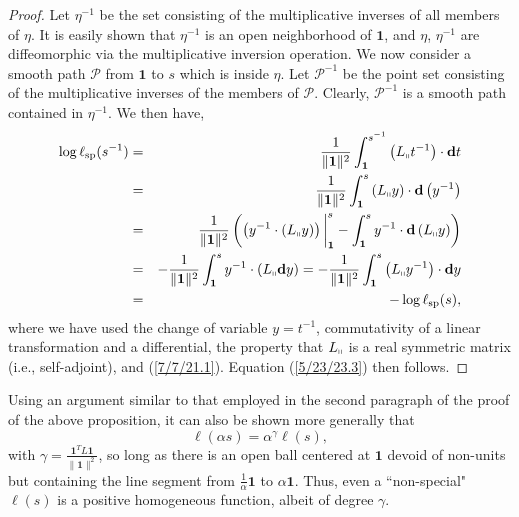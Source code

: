 \documentclass{amsart}
\theoremstyle{definition}
\numberwithin{theorem}{section}
\numberwithin{equation}{section}
\begin{document}
\begin{proof}
Let $\eta^{-1}$ be the set consisting of the multiplicative inverses of all members of $\eta$.  It is easily shown that $\eta^{-1}$ is an open neighborhood of $\mathbf{1}$, and $\eta$, $\eta^{-1}$ are diffeomorphic via the multiplicative inversion operation.  
We now consider a smooth path $\mathcal{P}$ from $\mathbf{1}$ to $s$ which is inside $\eta$.  Let $\mathcal{P}^{-1}$ be the point set consisting of the multiplicative inverses of the members of $\mathcal{P}$.  Clearly, $\mathcal{P}^{-1}$ is a smooth path contained in $\eta^{-1}$. 
 We then have, 
\begin{eqnarray}  \log \ell_{\rm sp}(s^{-1})   &=&   \frac{1}{\|{\bf 1}\|^2} \int_{\bf 1}^{s^{-1}} \left(L_{\shortparallel}t^{-1}\right) \cdot \mathbf{d}t \nonumber \\ &=&  \frac{1}{\|{\bf 1}\|^2} \int_{\bf 1}^s \left(L_{\shortparallel}y\right)\cdot \mathbf{d}\left(y^{-1}\right) \nonumber \\ &=&  \frac{1}{\|{\bf 1}\|^2}\left(\left(y^{-1}\cdot \left(L_{\shortparallel}y\right)\right)\bigg|_{\bf 1}^s - \int_{\bf 1}^s y^{-1}\cdot \mathbf{d}\left(L_{\shortparallel}y\right)\right)   \nonumber \\ &=& -\frac{1}{\|{\bf 1}\|^2} \int_{\bf 1}^s y^{-1}\cdot (L_{\shortparallel}\mathbf{d}y) = -\frac{1}{\|{\bf 1}\|^2} \int_{\bf 1}^s \left(L_{\shortparallel}y^{-1}\right) \cdot \mathbf{d}y  \nonumber \\ &=& -\log \ell_{\rm sp}(s),\label{4/2/23.5} \end{eqnarray} where we have used the change of variable $y=t^{-1}$, commutativity of a linear transformation and a differential, the property that $L_{\shortparallel}$ is a real symmetric matrix (i.e., self-adjoint), and  (\ref{7/7/21.1}).  Equation (\ref{5/23/23.3}) then follows.
\end{proof}

Using an argument similar to that employed in the second paragraph of the proof of the above proposition, it can also be shown more generally that  \[  \ell(\alpha s) = \alpha^\gamma \ell(s),\] with $\gamma = \frac{\mathbf{1}^T L \mathbf{1}}{\|\mathbf{1}\|^2}$, so long as there is an open ball centered at $\mathbf{1}$ devoid of non-units but containing the line segment from $\frac{1}{\alpha}\mathbf{1}$  to $\alpha\mathbf{1}$.  Thus, even a ``non-special" $ \ell(s)$ is a positive homogeneous function, albeit of degree $\gamma$.  
\end{document}

